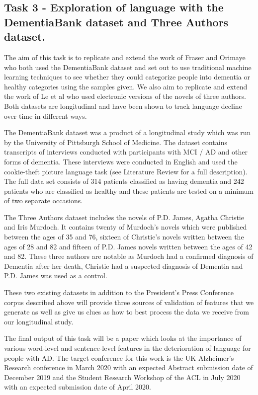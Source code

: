 \documentclass[10pt, letterpaper, twoside, openany]{book}
\begin{document}
\subsection{Task 3 - Exploration of language with the DementiaBank dataset and Three Authors dataset.}
The aim of this task is to replicate and extend the work of Fraser and Orimaye who both used the DementiaBank dataset and set out to use traditional machine learning techniques to see whether they could categorize people into dementia or healthy categories using the samples given. We also aim to replicate and extend the work of Le et al who used electronic versions of the novels of three authors. Both datasets are longitudinal and have been shown to track language decline over time in different ways.
\par 
The DementiaBank dataset was a product of a longitudinal study which was run by the University of Pittsburgh School of Medicine. The dataset contains transcripts of interviews conducted with participants with MCI / AD and other forms of dementia. These interviews were conducted in English and used the cookie-theft picture language task (see Literature Review for a full description). The full data set consists of 314 patients classified as having dementia and 242 patients who are classified as healthy and these patients are tested on a minimum of two separate occasions. 
\par 
The Three Authors dataset includes the novels of P.D. James, Agatha Christie and Iris Murdoch. It contains twenty of Murdoch's novels which were published between the ages of 35 and 76, sixteen of Christie's novels written between the ages of 28 and 82 and fifteen of P.D. James novels written between the ages of 42 and 82. These three authors are notable as Murdoch had a confirmed diagnosis of Dementia after her death, Christie had a suspected diagnosis of Dementia and P.D. James was used as a control.  
\par 
These two existing datasets in addition to the President's Press Conference corpus described above will provide three sources of validation of features that we generate as well as give us clues as how to best process the data we receive from our longitudinal study. 
\par 
The final output of this task will be a paper which looks at the importance of various word-level and sentence-level features in the deterioration of language for people with AD. The target conference for this work is the UK Alzheimer's Research conference in March 2020 with an expected Abstract submission date of December 2019 and the Student Research Workshop of the ACL in July 2020 with an expected submission date of April 2020.
\end{document}
